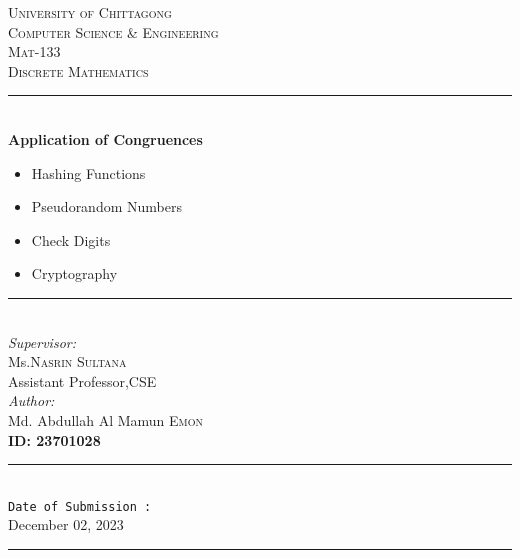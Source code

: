 \documentclass[12pt]{article}
\begin{document}
\begin{titlepage}
\newcommand{\HRule}{\rule{\linewidth}{0.5mm}} 
\center 
\textsc{\LARGE University of Chittagong}\\[1.2cm] 
\textsc{\Large Computer Science \& Engineering}\\[0.5cm] 
\textsc{\large Mat-133\\[0.1cm]Discrete Mathematics}\\[0.5cm] 
\HRule \\[0.4cm]
{ \huge \bfseries Application of Congruences}\\[0.4cm] 
\begin{itemize}
\centering
    \item Hashing Functions
    \item Pseudorandom Numbers
    \item Check Digits
    \item Cryptography
\end{itemize}
\HRule \\[1cm]
\centering
\emph{Supervisor:} \\
\LARGE Ms.\textsc{Nasrin Sultana} \\
\small Assistant Professor,CSE\\
\vspace{1cm}
\emph{Author:}\\
\large Md. Abdullah Al Mamun \textsc{Emon} \\
\textbf{ID: 23701028} \\
\vspace{1cm}
\HRule \\
\texttt{Date of Submission :} \\
\vspace{0.3cm}
{\Large December 02, 2023}\\ 
\HRule
\vfill
\end{titlepage}
\end{document}
